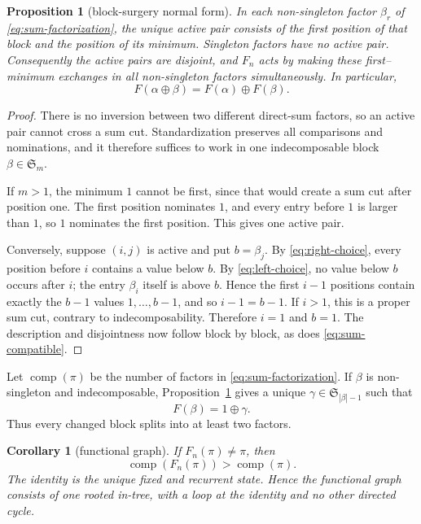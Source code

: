 \documentclass[a4paper,10pt]{amsart}
\newtheorem{proposition}[theorem]{Proposition}
\newtheorem{corollary}[theorem]{Corollary}
\theoremstyle{definition}
\theoremstyle{remark}
\newcommand{\Comp}{\operatorname{comp}}
\begin{document}
\begin{proposition}[block-surgery normal form]\label{prop:block}
In each non-singleton factor $\beta_r$ of
\eqref{eq:sum-factorization}, the unique active pair consists of the first
position of that block and the position of its minimum.  Singleton factors
have no active pair.  Consequently the active pairs are disjoint, and $F_n$
acts by making these first--minimum exchanges in all non-singleton factors
simultaneously.  In particular,
\begin{equation}\label{eq:sum-compatible}
                  F(\alpha\oplus\beta)=F(\alpha)\oplus F(\beta).
\end{equation}
\end{proposition}

\begin{proof}
There is no inversion between two different direct-sum factors, so an active
pair cannot cross a sum cut.  Standardization preserves all comparisons and
nominations, and it therefore suffices to work in one indecomposable block
$\beta\in\mathfrak S_m$.

If $m>1$, the minimum $1$ cannot be first, since that would create a sum cut
after position one.  The first position nominates $1$, and every entry before
$1$ is larger than $1$, so $1$ nominates the first position.  This gives one
active pair.

Conversely, suppose $(i,j)$ is active and put $b=\beta_j$.  By
\eqref{eq:right-choice}, every position before $i$ contains a value below
$b$.  By \eqref{eq:left-choice}, no value below $b$ occurs after $i$; the
entry $\beta_i$ itself is above $b$.  Hence the first $i-1$ positions contain
exactly the $b-1$ values $1,\ldots,b-1$, and so $i-1=b-1$.  If $i>1$, this is
a proper sum cut, contrary to indecomposability.  Therefore $i=1$ and $b=1$.
The description and disjointness now follow block by block, as does
\eqref{eq:sum-compatible}.
\end{proof}

Let $\Comp(\pi)$ be the number of factors in
\eqref{eq:sum-factorization}.  If $\beta$ is non-singleton and
indecomposable, Proposition~\ref{prop:block} gives a unique $\gamma\in
\mathfrak S_{|\beta|-1}$ such that
\begin{equation}\label{eq:one-gamma}
                         F(\beta)=1\oplus\gamma.
\end{equation}
Thus every changed block splits into at least two factors.

\begin{corollary}[functional graph]\label{cor:functional}
If $F_n(\pi)\ne\pi$, then
\[
                       \Comp(F_n(\pi))>\Comp(\pi).
\]
The identity is the unique fixed and recurrent state.  Hence the functional
graph consists of one rooted in-tree, with a loop at the identity and no
other directed cycle.
\end{corollary}
\end{document}
